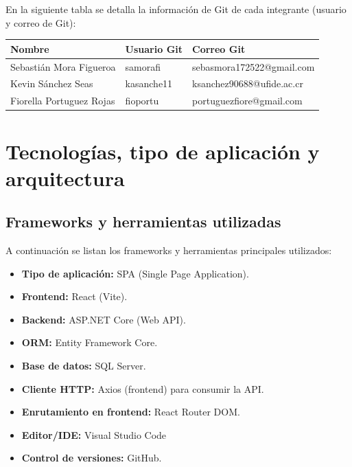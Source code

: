 \documentclass[11pt,a4paper]{article}
\begin{document}
En la siguiente tabla se detalla la información de Git de cada integrante 
(usuario y correo de Git):

\begin{longtable}{|l|l|l|}
\hline
\textbf{Nombre}                 & \textbf{Usuario Git} & \textbf{Correo Git}              \\
\hline
Sebastián Mora Figueroa        & samorafi             & sebasmora172522@gmail.com        \\ \hline
Kevin Sánchez Seas             & kasanche11           & ksanchez90688@ufide.ac.cr        \\ \hline
Fiorella Portuguez Rojas       & fioportu             & portuguezfiore@gmail.com         \\ \hline
\end{longtable}


\section{Tecnologías, tipo de aplicación y arquitectura}

\subsection{Frameworks y herramientas utilizadas}

A continuación se listan los frameworks y herramientas principales utilizados:

\begin{itemize}
    \item \textbf{Tipo de aplicación:} SPA (Single Page Application).
    \item \textbf{Frontend:} React (Vite).
    \item \textbf{Backend:} ASP.NET Core (Web API).
    \item \textbf{ORM:} Entity Framework Core.
    \item \textbf{Base de datos:} SQL Server.
    \item \textbf{Cliente HTTP:} Axios (frontend) para consumir la API.
    \item \textbf{Enrutamiento en frontend:} React Router DOM.
    \item \textbf{Editor/IDE:} Visual Studio Code
    \item \textbf{Control de versiones:} GitHub.
\end{itemize}
\end{document}
